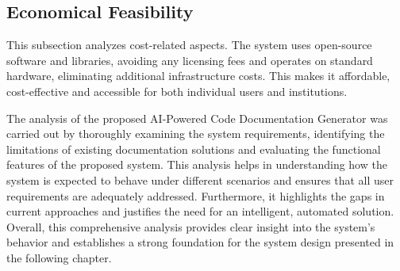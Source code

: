 \subsection{Economical Feasibility}
\hspace{0.5cm}
This subsection analyzes cost-related aspects. The system uses open-source software and libraries, avoiding any licensing fees and operates on standard hardware, eliminating additional infrastructure costs. This makes it affordable, cost-effective and accessible for both individual users and institutions.
\newline
\par The analysis of the proposed AI-Powered Code Documentation Generator was carried out by thoroughly examining the system requirements, identifying the limitations of existing documentation solutions and evaluating the functional features of the proposed system. This analysis helps in understanding how the system is expected to behave under different scenarios and ensures that all user requirements are adequately addressed. Furthermore, it highlights the gaps in current approaches and justifies the need for an intelligent, automated solution. Overall, this comprehensive analysis provides clear insight into the system’s behavior and establishes a strong foundation for the system design presented in the following chapter.




